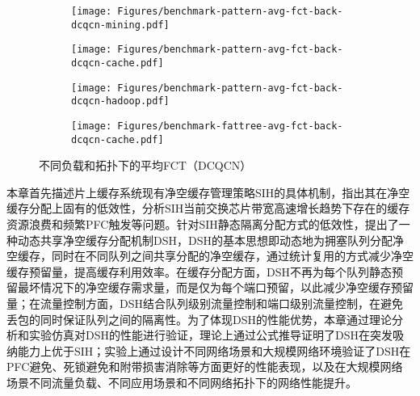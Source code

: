 \begin{figure}[H]
  \begin{subfigure}[b]{0.49\linewidth}
      \centering
      \texttt{[image: Figures/benchmark-pattern-avg-fct-back-dcqcn-mining.pdf]}
      \label{c3:s6:ss1:fig:sub1:benchmark pattern Spine-Leaf mining}
  \end{subfigure}
  \begin{subfigure}[b]{0.49\linewidth}
      \centering
      \texttt{[image: Figures/benchmark-pattern-avg-fct-back-dcqcn-cache.pdf]}
      \label{c3:s6:ss1:fig:sub1:benchmark pattern Spine-Leaf cache}
  \end{subfigure}
  \begin{subfigure}[b]{0.49\linewidth}
    \centering
    \texttt{[image: Figures/benchmark-pattern-avg-fct-back-dcqcn-hadoop.pdf]}
    \label{c3:s6:ss1:fig:sub1:benchmark pattern Spine-Leaf hadoop}
  \end{subfigure}
  \begin{subfigure}[b]{0.49\linewidth}
    \centering
    \texttt{[image: Figures/benchmark-fattree-avg-fct-back-dcqcn-cache.pdf]}
    \label{c3:s6:ss1:fig:sub1:benchmark pattern fat-tree search}
  \end{subfigure} 
  \caption{不同负载和拓扑下的平均FCT（DCQCN）}
  \label{c3:s6:ss1:fig:benchmark pattern and topology}
\end{figure}

\label{c3:s7:brief summary}

本章首先描述片上缓存系统现有净空缓存管理策略SIH的具体机制，指出其在净空缓存分配上固有的低效性，分析SIH当前交换芯片带宽高速增长趋势下存在的缓存资源浪费和频繁PFC触发等问题。针对SIH静态隔离分配方式的低效性，提出了一种动态共享净空缓存分配机制DSH，DSH的基本思想即动态地为拥塞队列分配净空缓存，同时在不同队列之间共享分配的净空缓存，通过统计复用的方式减少净空缓存预留量，提高缓存利用效率。在缓存分配方面，DSH不再为每个队列静态预留最坏情况下的净空缓存需求量，而是仅为每个端口预留，以此减少净空缓存预留量；在流量控制方面，DSH结合队列级别流量控制和端口级别流量控制，在避免丢包的同时保证队列之间的隔离性。为了体现DSH的性能优势，本章通过理论分析和实验仿真对DSH的性能进行验证，理论上通过公式推导证明了DSH在突发吸纳能力上优于SIH；实验上通过设计不同网络场景和大规模网络环境验证了DSH在PFC避免、死锁避免和附带损害消除等方面更好的性能表现，以及在大规模网络场景不同流量负载、不同应用场景和不同网络拓扑下的网络性能提升。

